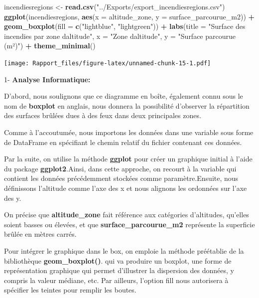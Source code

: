 \documentclass[
]{article}
\newenvironment{Shaded}{\begin{snugshade}}{\end{snugshade}}
\newcommand{\AttributeTok}[1]{\textcolor[rgb]{0.13,0.29,0.53}{#1}}
\newcommand{\FunctionTok}[1]{\textcolor[rgb]{0.13,0.29,0.53}{\textbf{#1}}}
\newcommand{\NormalTok}[1]{#1}
\newcommand{\OtherTok}[1]{\textcolor[rgb]{0.56,0.35,0.01}{#1}}
\newcommand{\SpecialCharTok}[1]{\textcolor[rgb]{0.81,0.36,0.00}{\textbf{#1}}}
\newcommand{\StringTok}[1]{\textcolor[rgb]{0.31,0.60,0.02}{#1}}
\begin{document}
\begin{Shaded}
\begin{Highlighting}[]
\NormalTok{incendiesregions }\OtherTok{\textless{}{-}} \FunctionTok{read.csv}\NormalTok{(}\StringTok{"../Exports/export\_incendiesregions.csv"}\NormalTok{)}
\FunctionTok{ggplot}\NormalTok{(incendiesregions, }\FunctionTok{aes}\NormalTok{(}\AttributeTok{x =}\NormalTok{ altitude\_zone, }\AttributeTok{y =}\NormalTok{ surface\_parcourue\_m2)) }\SpecialCharTok{+}
  \FunctionTok{geom\_boxplot}\NormalTok{(}\AttributeTok{fill =} \FunctionTok{c}\NormalTok{(}\StringTok{"lightblue"}\NormalTok{, }\StringTok{"lightgreen"}\NormalTok{)) }\SpecialCharTok{+}
  \FunctionTok{labs}\NormalTok{(}\AttributeTok{title =} \StringTok{"Surface des incendies par zone d\textquotesingle{}altitude"}\NormalTok{, }
       \AttributeTok{x =} \StringTok{"Zone d\textquotesingle{}altitude"}\NormalTok{, }
       \AttributeTok{y =} \StringTok{"Surface parcourue (m²)"}\NormalTok{) }\SpecialCharTok{+}
  \FunctionTok{theme\_minimal}\NormalTok{()}
\end{Highlighting}
\end{Shaded}

\texttt{[image: Rapport\_files/figure-latex/unnamed-chunk-15-1.pdf]}

1- \textbf{Analyse Informatique:}

D'abord, nous soulignons que ce diagramme en boîte, également connu sous
le nom de \textbf{boxplot} en anglais, nous donnera la possibilité
d'observer la répartition des surfaces brûlées dues à des feux dans deux
principales zones.

Comme à l'accoutumée, nous importons les données dans une variable sous
forme de DataFrame en spécifiant le chemin relatif du fichier contenant
ces données.

Par la suite, on utilise la méthode \textbf{ggplot} pour créer un
graphique initial à l'aide du package \textbf{ggplot2}.Ainsi, dans cette
approche, on recourt à la variable qui contient les données précédemment
stockées comme paramètre.Ensuite, nous définissons l'altitude comme
l'axe des x et nous alignons les ordonnées sur l'axe des y.

On précise que \textbf{altitude\_zone} fait référence aux catégories
d'altitudes, qu'elles soient basses ou élevées, et que
\textbf{surface\_parcourue\_m2} représente la superficie brûlée en
mètres carrés.

Pour intégrer le graphique dans le box, on emploie la méthode préétablie
de la bibliothèque \textbf{geom\_boxplot()}. qui va produire un boxplot,
une forme de représentation graphique qui permet d'illustrer la
dispersion des données, y compris la valeur médiane, etc. Par ailleurs,
l'option fill nous autorisera à spécifier les teintes pour remplir les
boutes.
\end{document}
